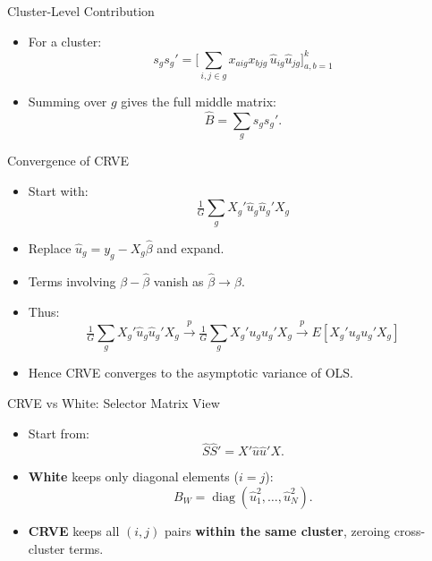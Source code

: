 \documentclass[
  ignorenonframetext,
]{beamer}
\providecommand{\tightlist}{%
  \setlength{\itemsep}{0pt}\setlength{\parskip}{0pt}}
\begin{document}
\begin{frame}{Cluster-Level Contribution}
\label{cluster-level-contribution}
\begin{itemize}
\tightlist
\item
  For a cluster: \[
  s_g s_g'
  =
  \bigl[\sum_{i,j\in g} x_{aig}x_{bjg}\,\hat u_{ig}\hat u_{jg}\bigr]_{a,b=1}^k
  \]
\item
  Summing over \(g\) gives the full middle matrix: \[
  \hat B = \sum_g s_g s_g'.
  \]
\end{itemize}
\end{frame}

\begin{frame}{Convergence of CRVE}
\label{convergence-of-crve}
\begin{itemize}
\tightlist
\item
  Start with: \[
  \tfrac1G \sum_g X_g'\hat u_g \hat u_g' X_g
  \]
\item
  Replace \(\hat u_g = y_g - X_g\hat\beta\) and expand.\\
\item
  Terms involving \(\beta-\hat\beta\) vanish as \(\hat\beta\to\beta\).\\
\item
  Thus: \[
  \tfrac1G\sum_g X_g'\hat u_g\hat u_g'X_g
  \xrightarrow{p}
  \tfrac1G\sum_g X_g'u_g u_g' X_g
  \xrightarrow{p}
  E[X_g'u_g u_g'X_g]
  \]
\item
  Hence CRVE converges to the asymptotic variance of OLS.
\end{itemize}
\end{frame}

\begin{frame}{CRVE vs White: Selector Matrix View}
\label{crve-vs-white-selector-matrix-view}
\begin{itemize}
\tightlist
\item
  Start from: \[
  \hat S\hat S' = X'\hat u \hat u' X.
  \]
\item
  \textbf{White} keeps only diagonal elements (\(i=j\)): \[
  B_W = \operatorname{diag}(\hat u_1^2,\dots,\hat u_N^2).
  \]
\item
  \textbf{CRVE} keeps all \((i,j)\) pairs \textbf{within the same
  cluster}, zeroing cross-cluster terms.
\end{itemize}
\end{frame}
\end{document}

